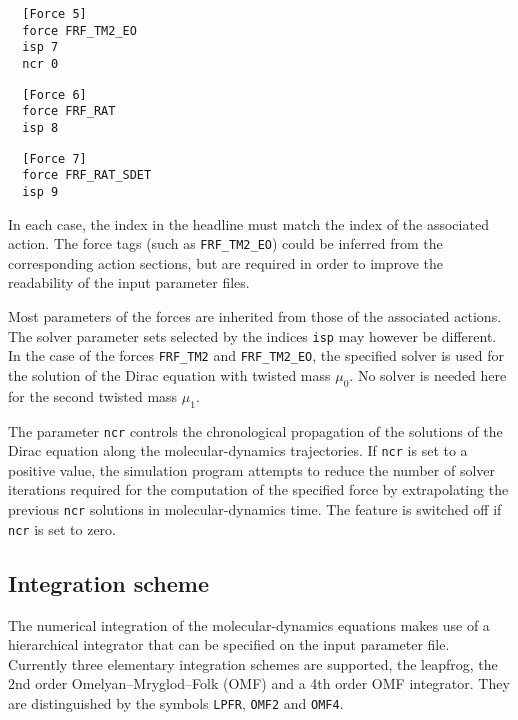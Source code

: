 \documentclass[11pt,fleqn]{article}
\begin{document}
\begin{verbatim}
  [Force 5]
  force FRF_TM2_EO
  isp 7
  ncr 0
\end{verbatim}

\begin{verbatim}
  [Force 6]
  force FRF_RAT
  isp 8
\end{verbatim}

\begin{verbatim}
  [Force 7]
  force FRF_RAT_SDET
  isp 9
\end{verbatim}
%
In each case, the index in the headline must match the index of the associated
action. The force tags (such as \texttt{FRF\_TM2\_EO}) could be inferred from
the corresponding action sections, but are required in order to improve the
readability of the input parameter files.

Most parameters of the forces are inherited from those of the associated
actions. The solver parameter sets selected by the indices \texttt{isp} may
however be different. In the case of the forces \texttt{FRF\_TM2} and
\texttt{FRF\_TM2\_EO}, the specified solver is used for the solution of the
Dirac equation with twisted mass $\mu_0$. No solver is needed here for the
second twisted mass $\mu_1$.

The parameter \texttt{ncr} controls the chronological propagation of the
solutions of the Dirac equation along the molecular-dynamics trajectories. If
\texttt{ncr} is set to a positive value, the simulation program attempts to
reduce the number of solver iterations required for the computation of the
specified force by extrapolating the previous \texttt{ncr} solutions in
molecular-dynamics time. The feature is switched off if \texttt{ncr} is set to
zero.





\subsection{Integration scheme}
\label{subsec:md:integrator}

The numerical integration of the molecular-dynamics equations makes use of a
hierarchical integrator that can be specified on the input parameter file.
Currently three elementary integration schemes are supported, the leapfrog, the
2nd order Omelyan–Mryglod–Folk (OMF) and a 4th order OMF integrator. They are
distinguished by the symbols \texttt{LPFR}, \texttt{OMF2} and \texttt{OMF4}.
\end{document}

